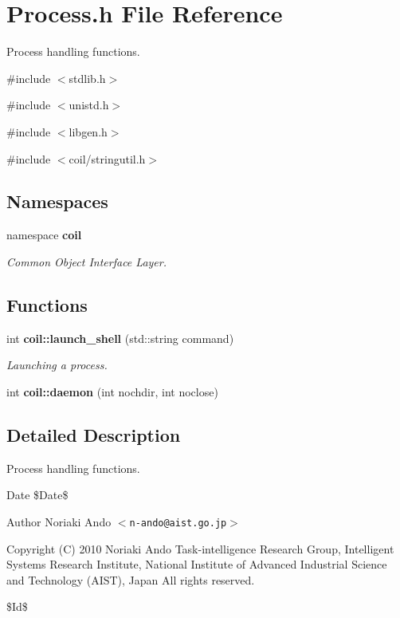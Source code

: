 \section{Process.h File Reference}
\label{Process_8h}


Process handling functions.  


{\ttfamily \#include $<$stdlib.h$>$}\par
{\ttfamily \#include $<$unistd.h$>$}\par
{\ttfamily \#include $<$libgen.h$>$}\par
{\ttfamily \#include $<$coil/stringutil.h$>$}\par
\subsection*{Namespaces}
\begin{DoxyCompactItemize}
\item 
namespace {\bf coil}


\begin{DoxyCompactList}\small\item\em Common Object Interface Layer. \item\end{DoxyCompactList}

\end{DoxyCompactItemize}
\subsection*{Functions}
\begin{DoxyCompactItemize}
\item 
int {\bf coil::launch\_\-shell} (std::string command)
\begin{DoxyCompactList}\small\item\em Launching a process. \item\end{DoxyCompactList}\item 
int {\bf coil::daemon} (int nochdir, int noclose)
\end{DoxyCompactItemize}


\subsection{Detailed Description}
Process handling functions. \begin{DoxyDate}{Date}
\$Date\$ 
\end{DoxyDate}
\begin{DoxyAuthor}{Author}
Noriaki Ando $<${\tt n-\/ando@aist.go.jp}$>$
\end{DoxyAuthor}
Copyright (C) 2010 Noriaki Ando Task-\/intelligence Research Group, Intelligent Systems Research Institute, National Institute of Advanced Industrial Science and Technology (AIST), Japan All rights reserved.

\$Id\$ 